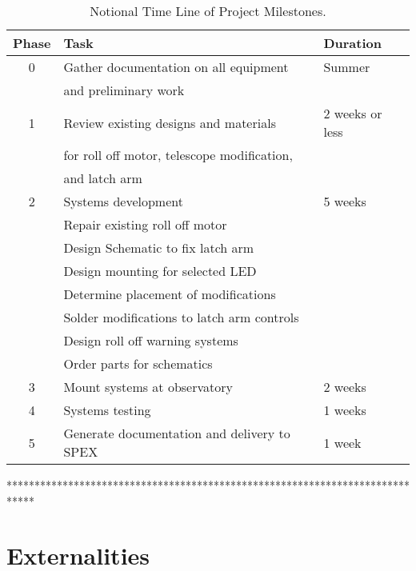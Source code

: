 \documentclass[conference]{IEEEtran} %
\begin{document}
\begin{table}[hb!]
    \caption{Notional Time Line of Project Milestones.}
    \centering
    \begin{tabular}{@{}cll@{}}
    \toprule
    Phase & Task & Duration \\
    \midrule
    0 & Gather documentation on all equipment & Summer\\ &  and preliminary work  \\
    1 & Review existing designs and materials & 2 weeks or less \\ & for roll off motor, telescope modification,\\ & and latch arm \\
    2 & Systems development & 5 weeks \\
      & Repair existing roll off motor  \\
      & Design Schematic to fix latch arm \\
      & Design mounting for selected LED \\
      & Determine placement of modifications\\
      & Solder modifications to latch arm controls\\
      & Design roll off warning systems \\
      & Order parts for schematics \\
    3 & Mount systems at observatory & 2 weeks  \\
    4 & Systems testing & 1 weeks  \\
    5 & Generate documentation and delivery to SPEX & 1 week  \\
    \bottomrule
    \end{tabular}
\label{tab:short-example}
\end{table}
*****************************************************************************
\section{Externalities}
\end{document}
